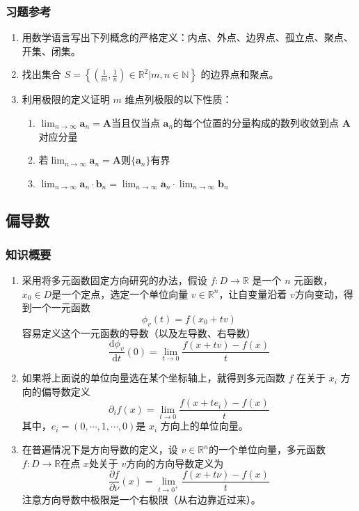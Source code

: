 \subsubsection{习题参考}
\begin{enumerate}
\item 用数学语言写出下列概念的严格定义：内点、外点、边界点、孤立点、聚点、开集、闭集。

\item 找出集合 $S=\left\{\left(\frac1m,\frac1n\right)\in\mathbb{R}^2|m,n\in\mathbb{N}\right\}$ 的边界点和聚点。

\item 利用极限的定义证明 $m$ 维点列极限的以下性质：
    \begin{enumerate}[(1)]

    \item $\lim _{n\to \infty} \mathbf{a}_n = \mathbf{A}$当且仅当点 $\mathbf{a}_n$的每个位置的分量构成的数列收敛到点 $\mathbf{A}$ 对应分量
    
    \item 若$\lim _{n\to \infty} \mathbf{a}_n = \mathbf{A}$则$\{ \mathbf{a}_n \}$有界
    
    \item $\lim _{n\to \infty} \mathbf{a}_n \cdot \mathbf{b}_n = \lim _{n\to \infty} \mathbf{a}_n \cdot \lim _{n\to \infty} \mathbf{b}_n $
    \end{enumerate}

\end{enumerate}

\subsection{偏导数}
\subsubsection{知识概要}
\begin{enumerate}
\item 采用将多元函数固定方向研究的办法，假设 $f: D \to \mathbb{R}$ 是一个 $n$ 元函数，$x_0 \in D$是一个定点，选定一个单位向量 $v \in \mathbb{R}^n$，让自变量沿着 $v$方向变动，得到一个一元函数
$$
\phi _v(t) = f(x_0 + t v) 
$$
容易定义这个一元函数的导数（以及左导数、右导数）
$$
\frac{\mathrm{d} \phi_ v}{\mathrm{d} t}(0)=\lim_{t\to 0}\frac{f(x+t v)-f(x)}{t}
$$

\item 如果将上面说的单位向量选在某个坐标轴上，就得到多元函数 $f$ 在关于 $x_i$ 方向的偏导数定义
$$
\partial_i f(x) = \lim_{t\to 0}\frac{f(x+t e_i)-f(x)}{t}
$$
其中，$e_i = (0,\cdots,1,\cdots,0)$是 $x_i$ 方向上的单位向量。

\item 在普遍情况下是方向导数的定义，设 $v\in \mathbb{R}^n$的一个单位向量，多元函数 $f:D\to \mathbb{R}$在点 $x$处关于 $v$方向的方向导数定义为
$$
\frac{\partial f}{\partial\nu}(x)=\lim_{t\to0^+}\frac{f(x+t\nu)-f(x)}t
$$
注意方向导数中极限是一个右极限（从右边靠近过来）。
\end{enumerate}

